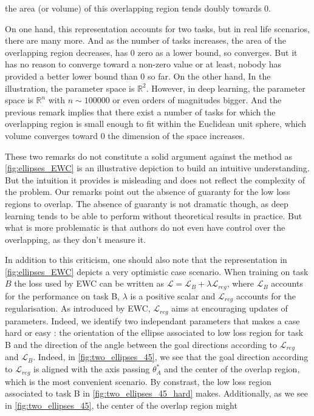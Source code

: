 \documentclass[11pt]{article}
\begin{document}
\vspace{1mm}
\noindent
the area (or volume) of this overlapping region tends doubly towards 0.

On one hand, this representation accounts for two tasks, but in real life scenarios, there are many more. And as the number of tasks increases, the area of the overlapping region decreases, has 0 zero as a lower bound, so converges. But it has no reason to converge toward a non-zero value or at least, nobody has provided a better lower bound than 0 so far.
On the other hand, In the illustration, the parameter space is $\mathbb{R}^2$. However, in deep learning, the parameter space is $\mathbb{R}^n$ with $n \sim 100 000$ or even orders of magnitudes bigger. And the previous remark implies that there exist a number of tasks for which the overlapping region is small enough to fit within the Euclidean unit sphere, which volume converges toward 0 the dimension of the space increases. 

These two remarks do not constitute a solid argument against the method as \ref{fig:ellipses_EWC} is an illustrative depiction to build an intuitive understanding. But the intuition it provides is misleading and does not reflect the complexity of the problem. Our remarks point out the absence of guaranty for the low loss regions to overlap. The absence of guaranty is not dramatic though, as deep learning tends to be able to perform without theoretical results in practice. But what is more problematic is that authors do not even have control over the overlapping, as they don't measure it.

\vspace{1mm}
\noindent
In addition to this criticism, one should also note that the representation in \ref{fig:ellipses_EWC} depicts a very optimistic case scenario. When training on task $B$ the loss used by EWC can be written as $\mathcal{L} = \mathcal{L}_{B} + \lambda\mathcal{L}_{reg}$, where $\mathcal{L}_{B}$ accounts for the performance on task B, $\lambda$ is a positive scalar and $\mathcal{L}_{reg}$ accounts for the regularisation. As introduced by EWC, $\mathcal{L}_{reg}$ aims at encouraging updates of parameters. Indeed, we identify two independant parameters that makes a case hard or easy : the orientation of the ellipse associated to low loss region for task B and the direction of the angle between the goal directions according to $\mathcal{L}_{reg}$ and $\mathcal{L}_B$. Indeed, in \ref{fig:two_ellipses_45}, we see that the goal direction according to $\mathcal{L}_{reg}$ is aligned with the axis passing $\theta_A^*$ and the center of the overlap region, which is the most convenient scenario. By constrast, the low loss region associated to task B in \ref{fig:two_ellipses_45_hard} makes. Additionally, as we see in \ref{fig:two_ellipses_45}, the center of the overlap region might
\end{document}
